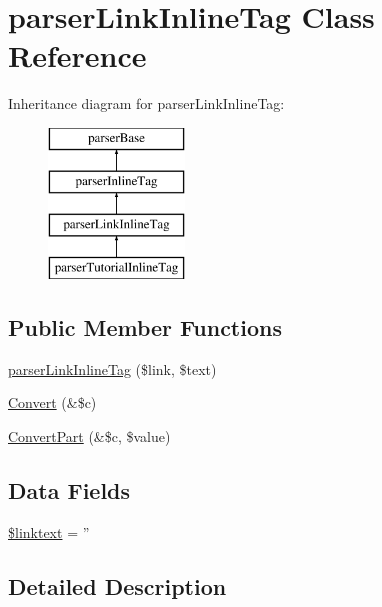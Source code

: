 \hypertarget{classparser_link_inline_tag}{\section{parser\-Link\-Inline\-Tag \-Class \-Reference}
\label{classparser_link_inline_tag}
}
\-Inheritance diagram for parser\-Link\-Inline\-Tag\-:\begin{figure}[H]
\begin{center}
\leavevmode
\includegraphics[height=4.000000cm]{classparser_link_inline_tag}
\end{center}
\end{figure}
\subsection*{\-Public \-Member \-Functions}
\begin{DoxyCompactItemize}
\item 
\hyperlink{classparser_link_inline_tag_a99755c147902ded32c366b54b6f0a276}{parser\-Link\-Inline\-Tag} (\$link, \$text)
\item 
\hyperlink{classparser_link_inline_tag_ad6c06bea9d11cc1c362b592306cfa707}{\-Convert} (\&\$c)
\item 
\hyperlink{classparser_link_inline_tag_a079249f7f358ce69316bf82f42f6d853}{\-Convert\-Part} (\&\$c, \$value)
\end{DoxyCompactItemize}
\subsection*{\-Data \-Fields}
\begin{DoxyCompactItemize}
\item 
\hyperlink{classparser_link_inline_tag_a612656cf6a1a05abf6cbe4624ce38ef6}{\$linktext} = ''
\end{DoxyCompactItemize}


\subsection{\-Detailed \-Description}


